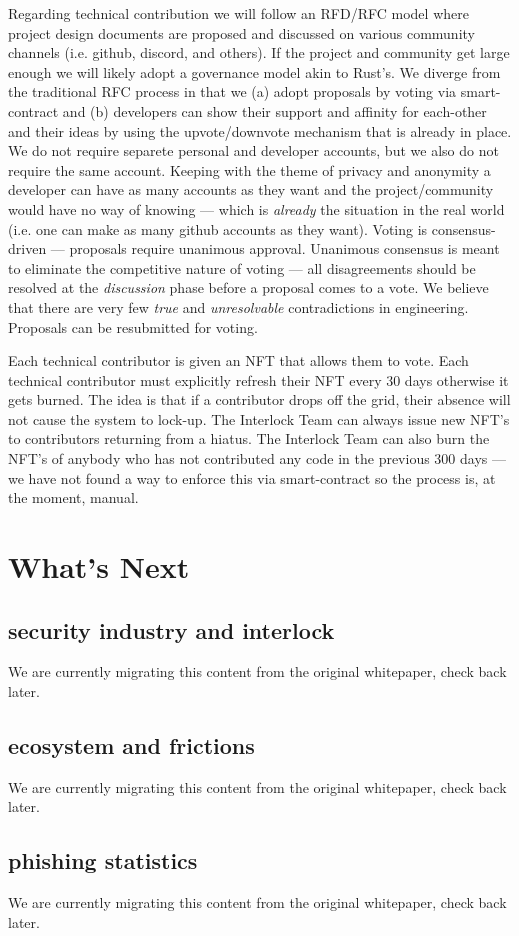 \documentclass[a4paper]{article}
\begin{document}
Regarding technical contribution we will follow an RFD/RFC model where project design documents are proposed and discussed on various community channels (i.e. github, discord, and others). If the project and community get large enough we will likely adopt a governance model akin to Rust's. We diverge from the traditional RFC process in that we (a) adopt proposals by voting via smart-contract and (b) developers can show their support and affinity for each-other and their ideas by using the upvote/downvote mechanism that is already in place. We do not require separete personal and developer accounts, but we also do not require the same account. Keeping with the theme of privacy and anonymity a developer can have as many accounts as they want and the project/community would have no way of knowing ---  which is \emph{already} the situation in the real world (i.e. one can make as many github accounts as they want). Voting is consensus-driven ---  proposals require unanimous approval. Unanimous consensus is meant to eliminate the competitive nature of voting ---  all disagreements should be resolved at the \emph{discussion} phase before a proposal comes to a vote. We believe that there are very few \emph{true} and \emph{unresolvable} contradictions in engineering. Proposals can be resubmitted for voting.

Each technical contributor is given an NFT that allows them to vote. Each technical contributor must explicitly refresh their NFT every 30 days otherwise it gets burned. The idea is that if a contributor drops off the grid, their absence will not cause the system to lock-up. The Interlock Team can always issue new NFT's to contributors returning from a hiatus. The Interlock Team can also burn the NFT's of anybody who has not contributed any code in the previous 300 days ---  we have not found a way to enforce this via smart-contract so the process is, at the moment, manual.
\section{What's Next}
\label{What's Next}
\subsection{security industry and interlock}
\label{security industry and interlock}

We are currently migrating this content from the original whitepaper, check back later.
\subsection{ecosystem and frictions}
\label{ecosystem and frictions}

We are currently migrating this content from the original whitepaper, check back later.
\subsection{phishing statistics}
\label{phishing statistics}

We are currently migrating this content from the original whitepaper, check back later.
\end{document}
